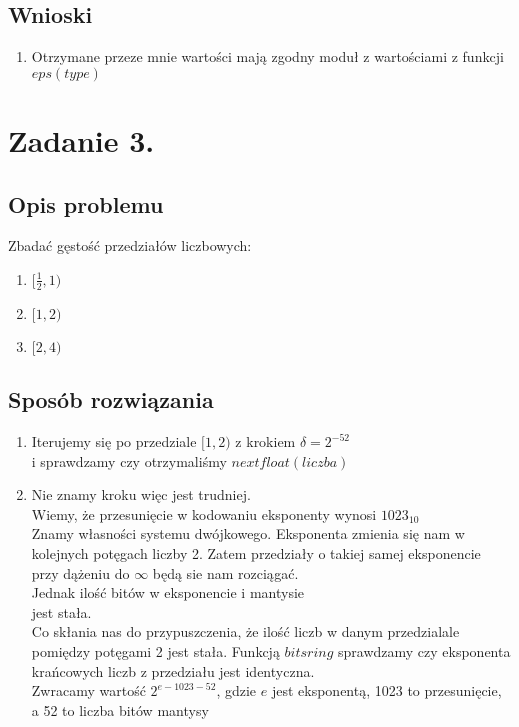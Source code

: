 \documentclass[12pt]{article}
\begin{document}
\subsection{Wnioski}
\begin{enumerate}
    \item Otrzymane przeze mnie wartości mają zgodny moduł z wartościami z funkcji $eps(type)$
\end{enumerate}
\section{Zadanie 3.}

\subsection{Opis problemu}
Zbadać gęstość przedziałów liczbowych:
\begin{enumerate}
    \item $[\frac{1}{2}, 1)$
    \item $[1, 2)$
    \item $[2, 4)$
\end{enumerate}
\subsection{Sposób rozwiązania}
\begin{enumerate}
    \item Iterujemy się po przedziale $[1, 2)$ z krokiem $\delta = {2^{-52}}$\\
    i sprawdzamy czy otrzymaliśmy $nextfloat(liczba)$
    \item Nie znamy kroku więc jest trudniej.\\
    Wiemy, że przesunięcie w kodowaniu eksponenty wynosi $1023_{10}$\\
    Znamy własności systemu dwójkowego. Eksponenta zmienia się nam
    w kolejnych potęgach liczby 2. Zatem przedziały o takiej samej eksponencie
    przy dążeniu do $\infty$ będą sie nam rozciągać. \\Jednak ilość bitów w eksponencie i mantysie\\
    jest stała. \\Co skłania nas do przypuszczenia, że ilość liczb w danym przedzialale\\
    pomiędzy potęgami 2 jest stała.
    Funkcją $bitsring$ sprawdzamy czy eksponenta krańcowych liczb z przedziału jest identyczna.\\
    Zwracamy wartość ${2^{e - 1023 - 52}} $, gdzie $e$ jest eksponentą, 1023 to przesunięcie,
    a 52 to liczba bitów mantysy

\end{enumerate}
\end{document}

